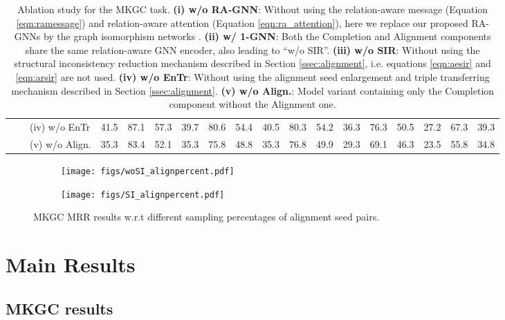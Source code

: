 \documentclass[11pt]{article}
\begin{document}
\begin{table*}[!t]
\begin{adjustbox}{width=440pt,center}
\begin{tabular}{l|ccc|ccc|ccc|ccc|ccc}
    \ \ \ \ (iv) w/o EnTr & 41.5 & 87.1 & 57.3 & 39.7 & 80.6 & 54.4 & 40.5 & 80.3 & 54.2 & 36.3 & 76.3 & 50.5 & 27.2 & 67.3 & 39.3 \\
    \ \ \ \ (v) w/o Align.  & 35.3 & 83.4 & 52.1 & 35.3 & 75.8 & 48.8 & 35.3 & 76.8 & 49.9 & 29.3 & 69.1 & 46.3 & 23.5 & 55.8 & 34.8 \\
    \hline
    \end{tabular}
    \end{adjustbox}
    \caption{Ablation study for the MKGC task.  \textbf{(i) w/o RA-GNN}: Without using the relation-aware message (Equation \ref{eqn:ramessage}) and relation-aware attention (Equation \ref{eqn:ra_attention}), here we replace our proposed RA-GNNs by the graph isomorphism networks  \cite{xu2018how}. \textbf{(ii)  w/ 1-GNN}: Both the Completion and Alignment components share the same relation-aware GNN encoder, also leading to ``w/o SIR''. \textbf{(iii) w/o SIR}: Without using the structural inconsistency reduction mechanism described in Section \ref{ssec:alignment}, i.e. equations \ref{eqn:aesir} and \ref{eqn:arsir} are not used. \textbf{(iv) w/o EnTr}: Without using the alignment seed enlargement and triple transferring mechanism described in Section \ref{ssec:alignment}.  \textbf{(v) w/o Align.}: Model variant containing only the Completion component without the Alignment one.}
    \label{tab:ablation_kgc_official}
\end{table*}


\begin{figure*}[!t]
    \centering
      \begin{subfigure}{0.49\linewidth}
        \centering
        \texttt{[image: figs/woSI\_alignpercent.pdf]}
\end{subfigure}
      \begin{subfigure}{0.49\linewidth}
        \centering
        \texttt{[image: figs/SI\_alignpercent.pdf]}
\end{subfigure}
\caption{MKGC MRR results w.r.t different sampling percentages of alignment seed pairs.}
    \label{fig:labeleffort}
 \end{figure*}
 

\section{Main Results}

\subsection{MKGC results}
\end{document}

